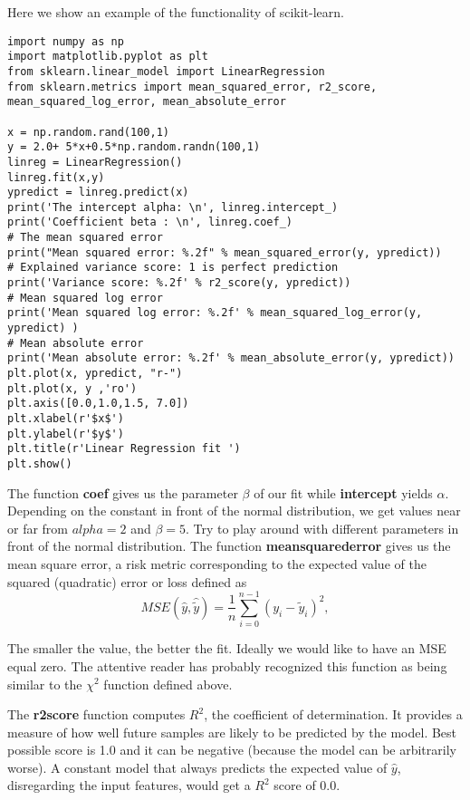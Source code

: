 \documentclass[%
oneside,                 %
final,                   %
10pt]{article}
\begin{document}
Here we show an
example of the functionality of scikit-learn.
\begin{verbatim}
import numpy as np 
import matplotlib.pyplot as plt 
from sklearn.linear_model import LinearRegression 
from sklearn.metrics import mean_squared_error, r2_score, mean_squared_log_error, mean_absolute_error

x = np.random.rand(100,1)
y = 2.0+ 5*x+0.5*np.random.randn(100,1)
linreg = LinearRegression()
linreg.fit(x,y)
ypredict = linreg.predict(x)
print('The intercept alpha: \n', linreg.intercept_)
print('Coefficient beta : \n', linreg.coef_)
# The mean squared error                               
print("Mean squared error: %.2f" % mean_squared_error(y, ypredict))
# Explained variance score: 1 is perfect prediction                                 
print('Variance score: %.2f' % r2_score(y, ypredict))
# Mean squared log error                                                        
print('Mean squared log error: %.2f' % mean_squared_log_error(y, ypredict) )
# Mean absolute error                                                           
print('Mean absolute error: %.2f' % mean_absolute_error(y, ypredict))
plt.plot(x, ypredict, "r-")
plt.plot(x, y ,'ro')
plt.axis([0.0,1.0,1.5, 7.0])
plt.xlabel(r'$x$')
plt.ylabel(r'$y$')
plt.title(r'Linear Regression fit ')
plt.show()

\end{verbatim}
The function \textbf{coef} gives us the parameter $\beta$ of our fit while \textbf{intercept} yields 
$\alpha$. Depending on the constant in front of the normal distribution, we get values near or far from $alpha =2$ and $\beta =5$. Try to play around with different parameters in front of the normal distribution. The function \textbf{meansquarederror} gives us the mean square error, a risk metric corresponding to the expected value of the squared (quadratic) error or loss defined as
\[ MSE(\hat{y},\hat{\tilde{y}}) = \frac{1}{n}
\sum_{i=0}^{n-1}(y_i-\tilde{y}_i)^2, 
\] 

The smaller the value, the better the fit. Ideally we would like to
have an MSE equal zero.  The attentive reader has probably recognized
this function as being similar to the $\chi^2$ function defined above.

The \textbf{r2score} function computes $R^2$, the coefficient of
determination. It provides a measure of how well future samples are
likely to be predicted by the model. Best possible score is 1.0 and it
can be negative (because the model can be arbitrarily worse). A
constant model that always predicts the expected value of $\hat{y}$,
disregarding the input features, would get a $R^2$ score of $0.0$.
\end{document}
